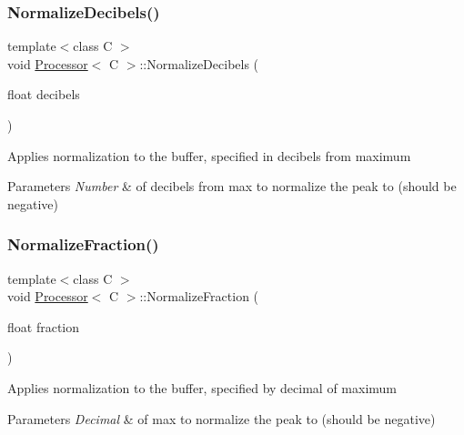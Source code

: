 \subsubsection{\texorpdfstring{Normalize\+Decibels()}{NormalizeDecibels()}}
{\footnotesize\ttfamily template$<$class C $>$ \\
void \hyperlink{classProcessor}{Processor}$<$ C $>$\+::Normalize\+Decibels (\begin{DoxyParamCaption}\item[{float}]{decibels }\end{DoxyParamCaption})\hspace{0.3cm}{\ttfamily [inline]}}

Applies normalization to the buffer, specified in decibels from maximum


\begin{DoxyParams}{Parameters}
{\em Number} & of decibels from max to normalize the peak to (should be negative) \\
\hline
\end{DoxyParams}
\mbox{\label{classProcessor_accb48e4f7a49d5804dac5438896a5b92}} 
\subsubsection{\texorpdfstring{Normalize\+Fraction()}{NormalizeFraction()}}
{\footnotesize\ttfamily template$<$class C $>$ \\
void \hyperlink{classProcessor}{Processor}$<$ C $>$\+::Normalize\+Fraction (\begin{DoxyParamCaption}\item[{float}]{fraction }\end{DoxyParamCaption})\hspace{0.3cm}{\ttfamily [inline]}}

Applies normalization to the buffer, specified by decimal of maximum


\begin{DoxyParams}{Parameters}
{\em Decimal} & of max to normalize the peak to (should be negative) \\
\hline
\end{DoxyParams}
\mbox{\label{classProcessor_a1f5e551c8a57d91bbc1b8f69ab51e590}} 
